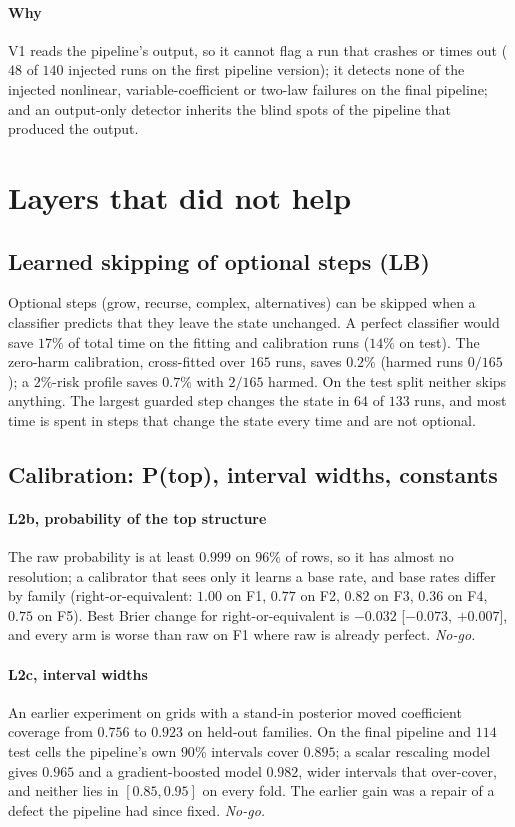 \documentclass[11pt]{article}
\theoremstyle{plain}
\theoremstyle{definition}
\theoremstyle{remark}
\begin{document}
\paragraph{Why} V1 reads the pipeline's output, so it cannot flag a run that crashes or times out ($48$ of $140$ injected runs on the first
pipeline version); it detects none of the injected nonlinear, variable-coefficient or two-law failures on the final pipeline; and an
output-only detector inherits the blind spots of the pipeline that produced the output.

\section{Layers that did not help}\label{sec:negative}
\subsection{Learned skipping of optional steps (LB)}\label{sec:lb}
Optional steps (grow, recurse, complex, alternatives) can be skipped when a classifier predicts that they leave the state unchanged. A perfect classifier
would save $17\%$ of total time on the fitting and calibration runs ($14\%$ on test). The zero-harm calibration, cross-fitted over $165$ runs, saves $0.2\%$
(harmed runs $0/165$); a $2\%$-risk profile saves $0.7\%$ with $2/165$ harmed. On the test split neither skips anything. The largest guarded step
changes the state in $64$ of $133$ runs, and most time is spent in steps that change the state every time and are not optional.

\subsection{Calibration: P(top), interval widths, constants}\label{sec:calib}
\paragraph{L2b, probability of the top structure} The raw probability is at least $0.999$ on $96\%$ of rows, so it has almost no resolution; a calibrator that sees only it learns a base rate,
and base rates differ by family (right-or-equivalent: $1.00$ on F1, $0.77$ on F2, $0.82$ on F3, $0.36$ on F4, $0.75$ on F5). Best Brier change for
right-or-equivalent is $-0.032$ [$-0.073$, $+0.007$], and every arm is worse than raw on F1 where raw is already perfect. \emph{No-go.}
\paragraph{L2c, interval widths} An earlier experiment on grids with a stand-in posterior moved coefficient coverage from $0.756$ to $0.923$ on held-out families.
On the final pipeline and $114$ test cells the pipeline's own $90\%$ intervals cover $0.895$; a scalar rescaling model gives $0.965$ and a gradient-boosted model $0.982$,
wider intervals that over-cover, and neither lies in $[0.85,0.95]$ on every fold. The earlier gain was a repair of a defect the pipeline had since fixed. \emph{No-go.}
\end{document}
